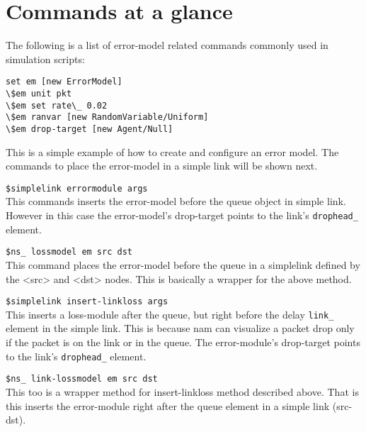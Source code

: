 \section{Commands at a glance}
\label{sec:errmodelcommand}

The following is a list of error-model related commands commonly used in
simulation scripts:

\begin{verbatim}
set em [new ErrorModel]
\$em unit pkt
\$em set rate\_ 0.02
\$em ranvar [new RandomVariable/Uniform]
\$em drop-target [new Agent/Null]
\end{verbatim}

This is a simple example of how to create and configure an error model.
The commands to place the error-model in a simple link will be shown next.

\begin{flushleft}
{\tt \$simplelink errormodule  \<args\>}\\
This commands inserts the error-model before the queue object in simple link.
However in this case the error-model's drop-target points to the link's
{\tt drophead\_} element.


{\tt \$ns\_ lossmodel \<em\> \<src\> \<dst\>}\\
This command places the error-model before the queue in a simplelink defined
by the <src> and <dst> nodes. This is basically a wrapper for the above method.


{\tt \$simplelink insert-linkloss \<args\>}\\
This inserts a loss-module after the queue, but right before the delay {\tt link\_}
element in the simple link. This is because nam can visualize a packet drop
only if the packet is on the link or in the queue. The error-module's
drop-target points to the link's {\tt drophead\_} element.


{\tt \$ns\_ link-lossmodel \<em\> \<src\> \<dst\>}\\
This too is a wrapper method for insert-linkloss method described above.
That is this inserts the error-module right after the queue element in a
simple link (src-dst).

\end{flushleft}


